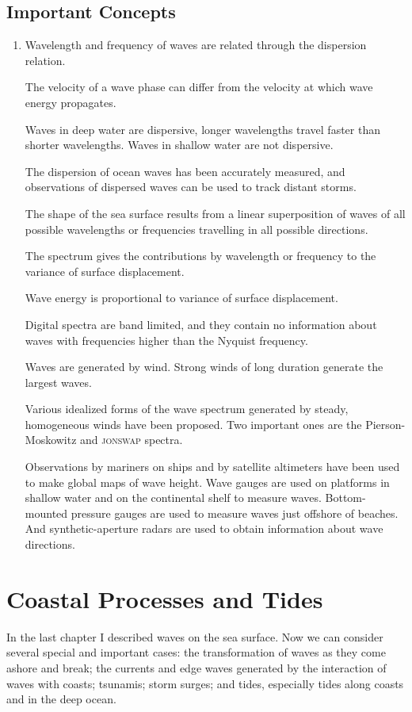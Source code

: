 \section{Important Concepts}
\begin{enumerate}
\item Wavelength and frequency of waves are related through the
dispersion relation.
  
\vitem The velocity of a wave phase can differ from the velocity at
which wave energy propagates.

\vitem Waves in deep water are dispersive, longer wavelengths travel
faster than shorter wavelengths. Waves in shallow water are not
dispersive.

\vitem The dispersion of ocean waves has been accurately measured, and
observations of dispersed waves can be used to track distant storms.

\vitem The shape of the sea surface results from a linear
superposition of waves of all possible wavelengths or frequencies
travelling in all possible directions.

\vitem The spectrum gives the contributions by wavelength or frequency
to the variance of surface displacement.

\vitem Wave energy is proportional to variance of surface
displacement.

\vitem Digital spectra are band limited, and they contain no
information about waves with frequencies higher than the Nyquist
frequency.

\vitem Waves are generated by wind. Strong winds of long duration
generate the largest waves.

\vitem Various idealized forms of the wave spectrum generated by
steady, homogeneous winds have been proposed. Two important ones are
the Pierson-Moskowitz and \textsc{jonswap} spectra.

\vitem Observations by mariners on ships and by satellite altimeters
have been used to make global maps of wave height. Wave gauges are
used on platforms in shallow water and on the continental shelf to
measure waves. Bottom-mounted pressure gauges are used to measure
waves just offshore of beaches. And synthetic-aperture radars are used
to obtain information about wave directions.
\end{enumerate}


\chapter{Coastal Processes and Tides} 
\addtocounter{figure}{1} In the last chapter I described waves on the
sea surface. Now we can consider several special and important cases:
the transformation of waves as they come ashore and break; the
currents and edge waves generated by the interaction of waves with
coasts; tsunamis; storm surges; and tides, especially
tides along coasts and in the deep ocean.

